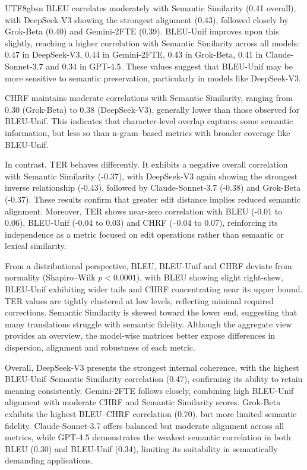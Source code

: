 \documentclass[conference]{IEEEtran}
\begin{document}
\begin{CJK*}{UTF8}{gbsn}
BLEU correlates moderately with Semantic Similarity (0.41 overall), with DeepSeek-V3 showing the strongest alignment (0.43), followed closely by Grok-Beta (0.40) and Gemini-2FTE (0.39). BLEU-Unif improves upon this slightly, reaching a higher correlation with Semantic Similarity across all models: 0.47 in DeepSeek-V3, 0.44 in Gemini-2FTE, 0.43 in Grok-Beta, 0.41 in Claude-Sonnet-3.7 and 0.34 in GPT-4.5. These values suggest that BLEU-Unif may be more sensitive to semantic preservation, particularly in models like DeepSeek-V3.

CHRF maintains moderate correlations with Semantic Similarity, ranging from 0.30 (Grok-Beta) to 0.38 (DeepSeek-V3), generally lower than those observed for BLEU-Unif. This indicates that character-level overlap captures some semantic information, but less so than n-gram–based metrics with broader coverage like BLEU-Unif.

In contrast, TER behaves differently. It exhibits a negative overall correlation with Semantic Similarity (-0.37), with DeepSeek-V3 again showing the strongest inverse relationship (-0.43), followed by Claude-Sonnet-3.7 (-0.38) and Grok-Beta (-0.37). These results confirm that greater edit distance implies reduced semantic alignment. Moreover, TER shows near-zero correlation with BLEU (-0.01 to 0.06), BLEU-Unif (-0.04 to 0.03) and CHRF (–0.04 to 0.07), reinforcing its independence as a metric focused on edit operations rather than semantic or lexical similarity.

From a distributional perspective, BLEU, BLEU-Unif and CHRF deviate from normality (Shapiro–Wilk $p < 0.0001$), with BLEU showing slight right-skew, BLEU-Unif exhibiting wider tails and CHRF concentrating near its upper bound. TER values are tightly clustered at low levels, reflecting minimal required corrections. Semantic Similarity is skewed toward the lower end, suggesting that many translations struggle with semantic fidelity. Although the aggregate view provides an overview, the model-wise matrices better expose differences in dispersion, alignment and robustness of each metric.

Overall, DeepSeek-V3 presents the strongest internal coherence, with the highest BLEU-Unif–Semantic Similarity correlation (0.47), confirming its ability to retain meaning consistently. Gemini-2FTE follows closely, combining high BLEU-Unif alignment with moderate CHRF and Semantic Similarity scores. Grok-Beta exhibits the highest BLEU–CHRF correlation (0.70), but more limited semantic fidelity. Claude-Sonnet-3.7 offers balanced but moderate alignment across all metrics, while GPT-4.5 demonstrates the weakest semantic correlation in both BLEU (0.30) and BLEU-Unif (0.34), limiting its suitability in semantically demanding applications.






\end{CJK*}
\end{document}
